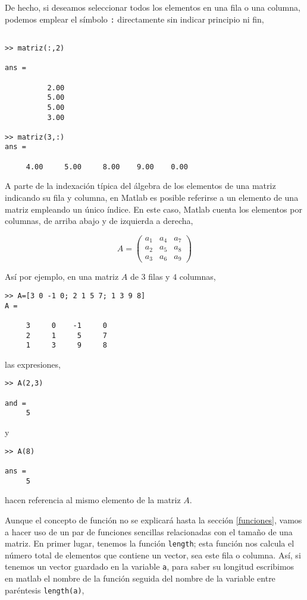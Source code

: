 De hecho, si deseamos seleccionar todos los elementos en una fila o una columna, podemos emplear el símbolo \texttt{:} directamente sin indicar principio ni fin,

\begin{verbatim}

>> matriz(:,2)

ans =

          2.00
          5.00
          5.00
          3.00

>> matriz(3,:)
ans =

     4.00     5.00     8.00    9.00    0.00
\end{verbatim}
 
\label{index}A parte de la indexación típica del álgebra de los elementos de una matriz indicando su fila y columna, en Matlab es posible referirse a un  elemento de una matriz empleando un único índice. En este caso, Matlab cuenta los elementos por columnas, de arriba abajo y de izquierda a derecha, 

\begin{equation*}
A=
\begin{pmatrix}
a_1&a_4&a_7\\
a_2&a_5&a_8\\
a_3&a_6&a_9
\end{pmatrix}
\end{equation*}

Así por ejemplo, en una matriz $A$ de $3$ filas y $4$ columnas, 
\begin{verbatim}
>> A=[3 0 -1 0; 2 1 5 7; 1 3 9 8]
A =

     3     0    -1     0
     2     1     5     7
     1     3     9     8
\end{verbatim}
las expresiones,
\begin{verbatim}
>> A(2,3)

and =
     5
\end{verbatim}
y
\begin{verbatim}
>> A(8)

ans =
     5
\end{verbatim} 
hacen referencia al mismo elemento de la matriz $A$. 

Aunque el concepto de función no se explicará hasta la sección \ref{funciones}, vamos a hacer uso de un par de funciones sencillas relacionadas con el tamaño de una matriz. En primer lugar, tenemos la función \texttt{length}; esta función nos calcula el número total de elementos que contiene un vector, sea este fila o columna.  Así, si tenemos un vector guardado en la variable  \texttt{a}, para saber su longitud escribimos en matlab el nombre de la función seguida del nombre de la variable entre paréntesis \texttt{length(a)},

